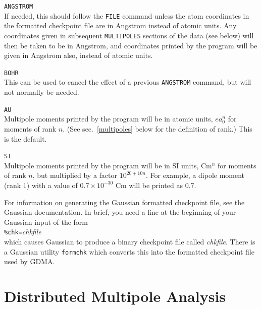 \documentclass[12pt,txfonts]{paper}
\begin{document}
\hspace*{2 em}\verb/ANGSTROM/\\
If needed, this should follow the \verb+FILE+ command unless the atom coordinates in
the formatted checkpoint file are in Angstrom instead of atomic units.
Any coordinates given in subsequent \verb+MULTIPOLES+ sections of the data
(see below) will then be taken to be in Angstrom, and coordinates printed
by the program will be given in Angstrom also, instead of atomic units.

\hspace*{2 em}\verb/BOHR/\\
This can be used to cancel the effect of a previous \verb/ANGSTROM/
command, but will not normally be needed.

\hspace*{2 em}\verb/AU/\\
Multipole moments printed by the program will be in atomic units,
$ea_0^n$ for moments of rank $n$. (See sec.~\ref{multipoles} below for
the definition of rank.) This is the default.

\hspace*{2 em}\verb/SI/\\
\label{SI}%
Multipole moments printed by the program will be in SI units, Cm$^n$
for moments of rank $n$, but multiplied by a factor $10^{20+10n}$. For
example, a dipole moment (rank 1) with a value of $0.7\times10^{-30}$
Cm will be printed as $0.7$.

For information on generating the Gaussian formatted checkpoint file,
see the Gaussian documentation. In brief, you need a line at the
beginning of your Gaussian input of the form\\
\hspace*{2 em}\verb:%chk=:\emph{chkfile}\\
which causes Gaussian to produce a binary checkpoint file called
\emph{chkfile}. There is a Gaussian utility \verb+formchk+ which
converts this into the formatted checkpoint file used by GDMA.

\section {Distributed Multipole Analysis}
\end{document}
